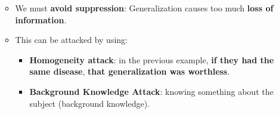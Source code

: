 \documentclass[9pt, letterpaper]{article}
\begin{document}
\begin{itemize}
\begin{itemize}
\begin{center}
\begin{tabular}{| C{1cm} | C{5cm} | C{5cm} | C{5cm} |}
				            \hline
			            \end{tabular}
		            \end{center}
		      \item We must \textbf{avoid suppression}: Generalization causes too much \textbf{loss of information}.
		      \item This can be attacked by using:
		            \begin{itemize}
			            \item \textbf{Homogeneity attack}: in the previous example, \textbf{if they had the same disease}, \textbf{that generalization was worthless}.
			            \item \textbf{Background Knowledge Attack}: knowing something about the subject (background knowledge).
		            \end{itemize}
	      \end{itemize}
\end{itemize}
\end{document}
